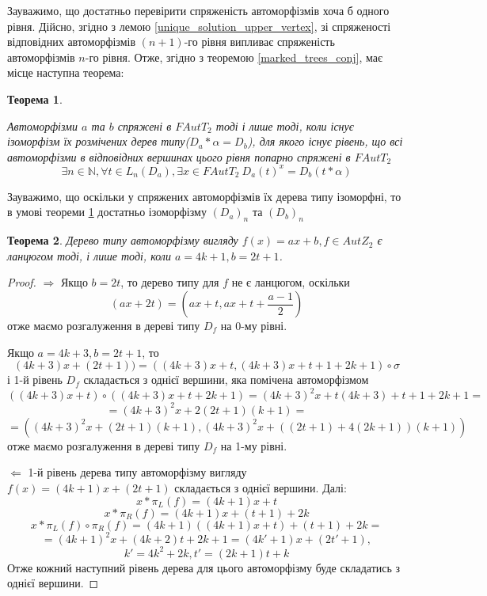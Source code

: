 \documentclass[a4paper,12pt]{article} \usepackage{a4wide}
\numberwithin{equation}{subsection}
\newtheorem{theorem}{Теорема}[subsection]
\begin{document}
Зауважимо, що достатньо перевірити спряженість автоморфізмів хоча б
одного рівня. Дійсно, згідно з лемою
\ref{unique_solution_upper_vertex}, зі спряженості відповідних
автоморфізмів $(n+1)$-го рівня випливає спряженість автоморфізмів
$n$-го рівня.  Отже, згідно з теоремою \ref{marked_trees_conj}, має
місце наступна теорема:
\begin{theorem}\label{marked_trees_conj_level}

  Автоморфізми $a$ та $b$ спряжені в $FAutT_2$ тоді і лише тоді, коли
  існує ізоморфізм їх розмічених дерев типу($D_a*\alpha = D_b$), для
  якого існує рівень, що всі автоморфізми в відповідних вершинах цього
  рівня попарно спряжені в $FAutT_2$
$$\exists n\in\mathbb{N}, \forall t\in L_n(D_a), \exists x\in FAutT_2\ D_a(t)^x= D_b(t*\alpha) $$
\end{theorem}
Зауважимо, що оскільки у спряжених автоморфізмів їх дерева типу
ізоморфні, то в умові теореми \ref{marked_trees_conj_level} достатньо
ізоморфізму $(D_a)_n$ та $(D_b)_n$

\begin{theorem}\label{Spherical_lin_tree}
  Дерево типу автоморфізму вигляду $f(x) = ax+b, f \in AutZ_2$ є
  ланцюгом тоді, і лише тоді, коли $a = 4k+1, b = 2t+1$.
\end{theorem}
\begin{proof}
  $\Rightarrow$ Якщо $b = 2t$, то дерево типу для $f$ не є ланцюгом,
  оскільки
$$(ax+2t) = \left(ax + t, ax + t + \frac{a-1}{2}\right)$$
отже маємо розгалуження в дереві типу $D_f$ на 0-му рівні.

Якщо $a = 4k+3, b = 2t+1$, то
 $$(4k+3)x+(2t+1)) = ((4k+3)x + t, (4k+3)x + t + 1 + 2k+1)\circ \sigma$$
 і 1-й рівень $D_f$ складається з однієї вершини, яка помічена
 автоморфізмом
 $$((4k+3)x + t)\circ ((4k+3)x + t + 2k+1) = (4k+3)^2x +t(4k+3)+t+ 1 + 2k+1 =$$
 $$ = (4k+3)^2x +2(2t+1)(k+1) =$$ $$= ((4k+3)^2x +(2t+1)(k+1),(4k+3)^2x +((2t+1)+4(2k+1))(k+1)) $$
 отже маємо розгалуження в дереві типу $D_f$ на 1-му рівні.

 $\Leftarrow$ 1-й рівень дерева типу автоморфізму вигляду $f(x) =
 (4k+1)x+(2t+1)$ складається з однієї вершини. Далі:
$$x*\pi_L(f) = (4k+1)x+t$$ $$ x*\pi_R(f) = (4k+1)x+(t+1)+2k $$ 
$$x*\pi_L(f)\circ \pi_R(f) = (4k+1)((4k+1)x+t)+(t+1)+2k =$$
 $$= (4k+1)^2x + (4k+2)t + 2k + 1 = (4k'+1)x+(2t'+1), $$ 
$$k' = 4k^2 + 2k , t' = (2k+1)t + k$$
Отже кожний наступний рівень дерева для цього автоморфізму буде
складатись з однієї вершини.
\end{proof}
\end{document}
